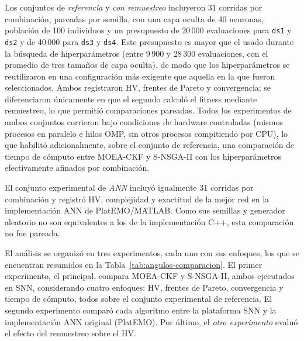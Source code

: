 Los conjuntos de \textit{referencia} y \textit{con remuestreo} incluyeron 31 corridas por combinación, pareadas por semilla, con una capa oculta de 40 neuronas, población de 100 individuos y un presupuesto de 20\,000 evaluaciones para \texttt{ds1} y \texttt{ds2} y de 40\,000 para \texttt{ds3} y \texttt{ds4}. Este presupuesto es mayor que el usado durante la búsqueda de hiperparámetros (entre 9\,900 y 28\,300 evaluaciones, con el promedio de tres tamaños de capa oculta), de modo que los hiperparámetros se reutilizaron en una configuración más exigente que aquella en la que fueron seleccionados. Ambos registraron HV, frentes de Pareto y convergencia; se diferenciaron únicamente en que el segundo calculó el fitness mediante remuestreo, lo que permitió comparaciones pareadas. Todos los experimentos de ambos conjuntos corrieron bajo condiciones de hardware controladas (mismos procesos en paralelo e hilos OMP, sin otros procesos compitiendo por CPU), lo que habilitó adicionalmente, sobre el conjunto de referencia, una comparación de tiempo de cómputo entre MOEA-CKF y S-NSGA-II con los hiperparámetros efectivamente afinados por combinación.

El conjunto experimental de \textit{ANN} incluyó igualmente 31 corridas por combinación y registró HV, complejidad y exactitud de la mejor red en la implementación ANN de PlatEMO/MATLAB. Como sus semillas y generador aleatorio no son equivalentes a los de la implementación C++, esta comparación no fue pareada.

El análisis se organizó en tres experimentos, cada uno con sus enfoques, los que se encuentran resumidos en la Tabla~\ref{tab:angulos-comparacion}. El primer experimento, el principal, compara MOEA-CKF y S-NSGA-II, ambos ejecutados en SNN, considerando cuatro enfoques: HV, frentes de Pareto, convergencia y tiempo de cómputo, todos sobre el conjunto experimental de referencia. El segundo experimento comparó cada algoritmo entre la plataforma SNN y la implementación ANN original (PlatEMO). Por último, el \textit{otro experimento} evaluó el efecto del remuestreo sobre el HV.

